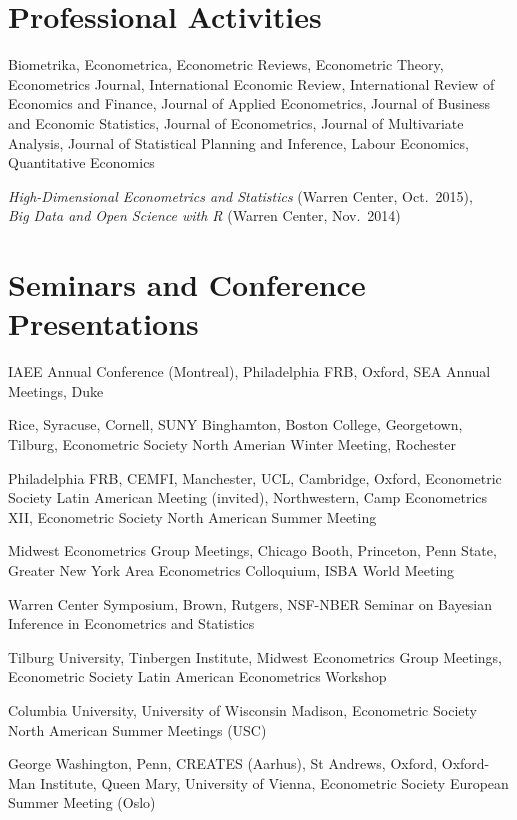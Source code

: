 \documentclass[line,overlapped]{myres}
\begin{document}
\begin{resume}
\section{\sc Professional Activities}

\begin{description}[style=multiline,leftmargin=3cm,font=\normalfont]
  \item[Refereeing:] Biometrika, Econometrica, Econometric Reviews, Econometric Theory, Econometrics Journal, International Economic Review, International Review of Economics and Finance, Journal of Applied Econometrics, Journal of Business and Economic Statistics, Journal of Econometrics, Journal of Multivariate Analysis, Journal of Statistical Planning and Inference, Labour Economics, Quantitative Economics 
  \item[Workshops \\ Organized:]
    \emph{High-Dimensional Econometrics and Statistics} (Warren Center, Oct.\ 2015), \\
    \emph{Big Data and Open Science with R} (Warren Center, Nov.\ 2014)
\end{description}



\section{\sc Seminars and Conference Presentations}

\begin{description}[style=multiline,leftmargin=2cm,font=\normalfont]
  \item[2018--2019:] IAEE Annual Conference (Montreal), Philadelphia FRB, Oxford, SEA Annual Meetings, Duke 
  \item[2017--2018:] Rice, Syracuse, Cornell, SUNY Binghamton, Boston College, Georgetown, Tilburg, Econometric Society North Amerian Winter Meeting, Rochester 
\item[2016--2017:] Philadelphia FRB, CEMFI, Manchester, UCL, Cambridge, Oxford, Econometric Society Latin American Meeting (invited), Northwestern, Camp Econometrics XII, Econometric Society North American Summer Meeting
\item[2015--2016:] Midwest Econometrics Group Meetings, Chicago Booth, Princeton, Penn State, Greater New York Area Econometrics Colloquium, ISBA World Meeting 
\item[2014--2015:] Warren Center Symposium, Brown, Rutgers, NSF-NBER Seminar on Bayesian Inference in Econometrics and Statistics 
\item[2013--2014:] Tilburg University, Tinbergen Institute, Midwest Econometrics Group Meetings, Econometric Society Latin American Econometrics Workshop
\item[2012--2013:] Columbia University, University of Wisconsin Madison, Econometric Society North American Summer Meetings (USC)
\item[2011--2012:] George Washington, Penn, CREATES (Aarhus), St Andrews, Oxford, Oxford-Man Institute, Queen Mary, University of Vienna, Econometric Society European Summer Meeting (Oslo)
\end{description}



\end{resume}
\end{document}
